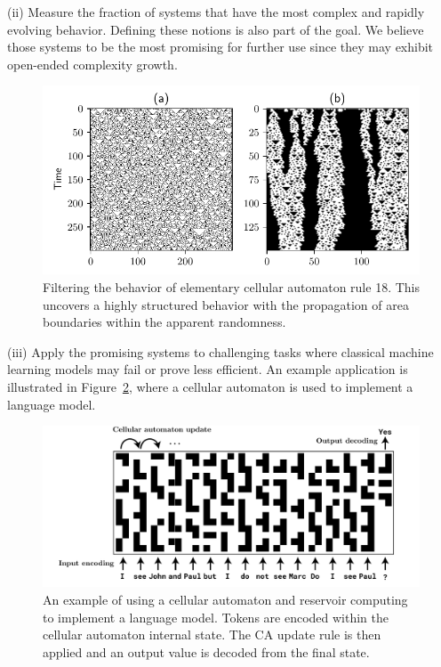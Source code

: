 (ii) Measure the fraction of systems that have the most complex and rapidly
evolving behavior. Defining these notions is also part of the goal. We believe
those systems to be the most promising for further use since they may exhibit
open-ended complexity growth.

\begin{figure}[htbp]
  \centering
 \includegraphics[width=.9\linewidth]{figures/rule18_small}
 \caption{Filtering the behavior of elementary cellular automaton rule 18. This
   uncovers a highly structured behavior with the propagation of area boundaries
   within the apparent randomness.}
  \label{fig:rule_18}
\end{figure}


(iii) Apply the promising systems to challenging tasks where classical machine
learning models may fail or prove less efficient. An example application is
illustrated in Figure~\ref{fig:ca_lm}, where a cellular automaton is used to
implement a language model.

\begin{figure}[htbp]
  \centering
  \includegraphics[width=.9\linewidth]{figures/ca_lm}
  \caption{An example of using a cellular automaton and reservoir computing to
    implement a language model. Tokens are encoded within the cellular automaton
  internal state. The CA update rule is then applied and an output value is
  decoded from the final state.}
  \label{fig:ca_lm}
\end{figure}


